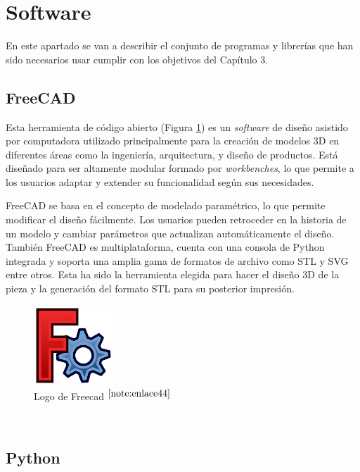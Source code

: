 \section{Software}

En este apartado se van a describir el conjunto de programas y librerías que han sido necesarios usar cumplir con los objetivos del Capítulo 3.

\subsection{FreeCAD}

Esta herramienta de código abierto (Figura \ref{fig:freecad}) es un \textit{software} de diseño asistido por computadora utilizado principalmente para la creación de modelos 3D en diferentes áreas como la ingeniería, arquitectura, y diseño de productos. Está diseñado para ser altamente modular formado por \textit{workbenches}, lo que permite a los usuarios adaptar y extender su funcionalidad según sus necesidades.

FreeCAD se basa en el concepto de modelado paramétrico, lo que permite modificar el diseño fácilmente. Los usuarios pueden retroceder en la historia de un modelo y cambiar parámetros que actualizan automáticamente el diseño. También FreeCAD es multiplataforma, cuenta con una consola de Python integrada y soporta una amplia gama de formatos de archivo como STL y SVG entre otros. Esta ha sido la herramienta elegida para hacer el diseño 3D de la pieza y la generación del formato STL para su posterior impresión. 

\begin{figure} [h!]
	\begin{center}
		\includegraphics[width=3cm]{figs/freecad.png}
	\end{center}
	\caption{Logo de Freecad $^{\ref{note:enlace44}}$} 
	\label{fig:freecad}
\end{figure}\

\setcounter{footnote}{44} %

\subsection{Python}

